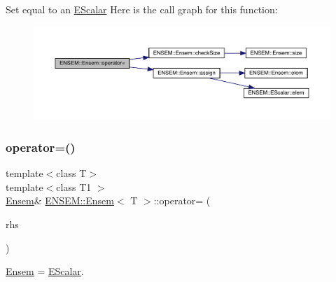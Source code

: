 Set equal to an \mbox{\hyperlink{classENSEM_1_1EScalar}{E\+Scalar}} Here is the call graph for this function\+:
\nopagebreak
\begin{figure}[H]
\begin{center}
\leavevmode
\includegraphics[width=350pt]{d7/d3e/classENSEM_1_1Ensem_a376ab0239198595a09384c13d7a1ad1c_cgraph}
\end{center}
\end{figure}
\mbox{\label{classENSEM_1_1Ensem_a376ab0239198595a09384c13d7a1ad1c}} 
\subsubsection{\texorpdfstring{operator=()}{operator=()}\hspace{0.1cm}{\footnotesize\ttfamily [9/15]}}
{\footnotesize\ttfamily template$<$class T$>$ \\
template$<$class T1 $>$ \\
\mbox{\hyperlink{classENSEM_1_1Ensem}{Ensem}}\& \mbox{\hyperlink{classENSEM_1_1Ensem}{E\+N\+S\+E\+M\+::\+Ensem}}$<$ T $>$\+::operator= (\begin{DoxyParamCaption}\item[{const \mbox{\hyperlink{classENSEM_1_1EScalar}{E\+Scalar}}$<$ T1 $>$ \&}]{rhs }\end{DoxyParamCaption})\hspace{0.3cm}{\ttfamily [inline]}}



\mbox{\hyperlink{classENSEM_1_1Ensem}{Ensem}} = \mbox{\hyperlink{classENSEM_1_1EScalar}{E\+Scalar}}. 

